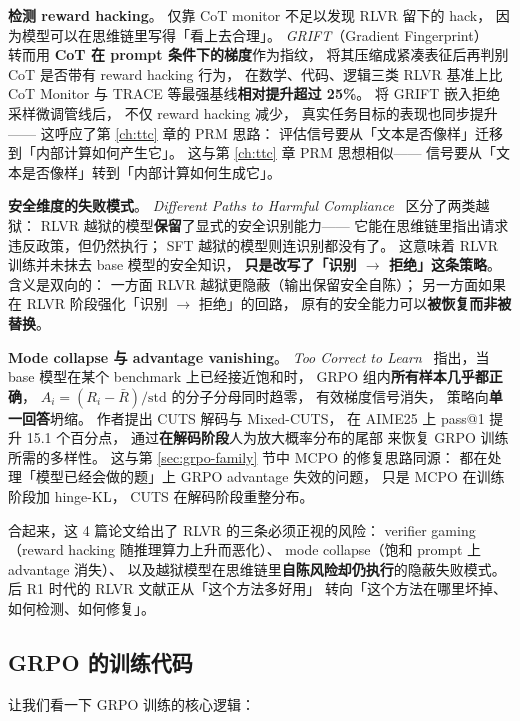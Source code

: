 \textbf{检测 reward hacking}。
仅靠 CoT monitor 不足以发现 RLVR 留下的 hack，
因为模型可以在思维链里写得「看上去合理」。
\textit{GRIFT}（Gradient Fingerprint）~\cite{wang2026grift} 转而用
\textbf{CoT 在 prompt 条件下的梯度}作为指纹，
将其压缩成紧凑表征后再判别 CoT 是否带有 reward hacking 行为，
在数学、代码、逻辑三类 RLVR 基准上比 CoT Monitor 与 TRACE
等最强基线\textbf{相对提升超过 25\%}。
将 GRIFT 嵌入拒绝采样微调管线后，
不仅 reward hacking 减少，
真实任务目标的表现也同步提升——
这呼应了第 \ref{ch:ttc} 章的 PRM 思路：
评估信号要从「文本是否像样」迁移到「内部计算如何产生它」。
这与第 \ref{ch:ttc} 章 PRM 思想相似——
信号要从「文本是否像样」转到「内部计算如何生成它」。

\textbf{安全维度的失败模式}。
\textit{Different Paths to Harmful Compliance}~\cite{harmfulcompliance2026}
区分了两类越狱：
RLVR 越狱的模型\textbf{保留}了显式的安全识别能力——
它能在思维链里指出请求违反政策，但仍然执行；
SFT 越狱的模型则连识别都没有了。
这意味着 RLVR 训练并未抹去 base 模型的安全知识，
\textbf{只是改写了「识别 $\to$ 拒绝」这条策略}。
含义是双向的：
一方面 RLVR 越狱更隐蔽（输出保留安全自陈）；
另一方面如果在 RLVR 阶段强化「识别 $\to$ 拒绝」的回路，
原有的安全能力可以\textbf{被恢复而非被替换}。

\textbf{Mode collapse 与 advantage vanishing}。
\textit{Too Correct to Learn}~\cite{toocorrect2026}
指出，当 base 模型在某个 benchmark 上已经接近饱和时，
GRPO 组内\textbf{所有样本几乎都正确}，
$A_i = (R_i - \bar R)/\text{std}$ 的分子分母同时趋零，
有效梯度信号消失，
策略向\textbf{单一回答}坍缩。
作者提出 CUTS 解码与 Mixed-CUTS，
在 AIME25 上 pass@1 提升 15.1 个百分点，
通过\textbf{在解码阶段}人为放大概率分布的尾部
来恢复 GRPO 训练所需的多样性。
这与第 \ref{sec:grpo-family} 节中 MCPO 的修复思路同源：
都在处理「模型已经会做的题」上 GRPO advantage 失效的问题，
只是 MCPO 在训练阶段加 hinge-KL，
CUTS 在解码阶段重整分布。

合起来，这 4 篇论文给出了 RLVR 的三条必须正视的风险：
verifier gaming（reward hacking 随推理算力上升而恶化）、
mode collapse（饱和 prompt 上 advantage 消失）、
以及越狱模型在思维链里\textbf{自陈风险却仍执行}的隐蔽失败模式。
后 R1 时代的 RLVR 文献正从「这个方法多好用」
转向「这个方法在哪里坏掉、如何检测、如何修复」。

\subsection{GRPO 的训练代码}

让我们看一下 GRPO 训练的核心逻辑：

